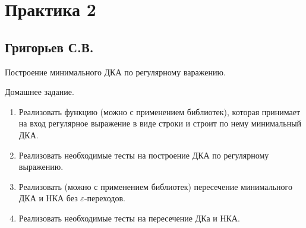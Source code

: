 \section{Практика 2}

\subsection{Григорьев С.В.}

Построение минимального ДКА по регулярному варажению.

Домашнее задание.
\begin{enumerate}
	\item Реализовать функцию (можно с применением библиотек), которая принимает на вход регулярное выражение в виде строки и строит по нему минимальный ДКА.
	\item Реализовать необходимые тесты на построение ДКА по регулярному выражению.
	\item Реализовать (можно с применением библиотек) пересечение минимального ДКА и НКА без $\varepsilon$-переходов.
	\item Реализовать необходимые тесты на пересечение ДКа и НКА.
\end{enumerate}





